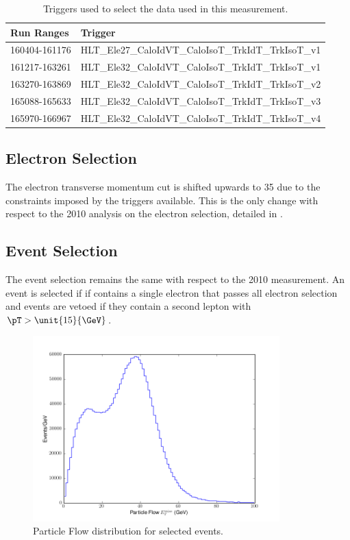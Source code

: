 \begin{table}[htbp]
  \begin{center}
    \leavevmode
     \begin{tabular}{ll} 
\toprule
      Run Ranges & Trigger  \\
     \midrule
     160404-161176 & HLT\_Ele27\_CaloIdVT\_CaloIsoT\_TrkIdT\_TrkIsoT\_v1  \\
     161217-163261 & HLT\_Ele32\_CaloIdVT\_CaloIsoT\_TrkIdT\_TrkIsoT\_v1  \\
     163270-163869 & HLT\_Ele32\_CaloIdVT\_CaloIsoT\_TrkIdT\_TrkIsoT\_v2  \\
     165088-165633 & HLT\_Ele32\_CaloIdVT\_CaloIsoT\_TrkIdT\_TrkIsoT\_v3  \\
     165970-166967 & HLT\_Ele32\_CaloIdVT\_CaloIsoT\_TrkIdT\_TrkIsoT\_v4  \\
\bottomrule
     \end{tabular}
  \caption{Triggers used to select the data used in this measurement.}
  \label{tab:updatedtriggers}
   \end{center}
\end{table}

\subsection{Electron Selection}

The electron transverse momentum cut is shifted upwards to \unit{35}{\GeV} due
to the constraints imposed by the triggers available.  This is the only change
with respect to the 2010 analysis on the electron selection, detailed in
.

\subsection{Event Selection}
The event selection remains the same with respect to the 2010 measurement.
An event is selected if if contains a single electron that passes all electron
selection and events are vetoed if they contain a second lepton with
$\pT>\unit{15}{\GeV}$.


\begin{figure}[htbp]
  \centering
  \includegraphics*[width=0.85\textwidth]{pfmet_update}
  \caption{Particle Flow \ETm distribution for selected events.}
  \label{fig:pfmet}
\end{figure}


